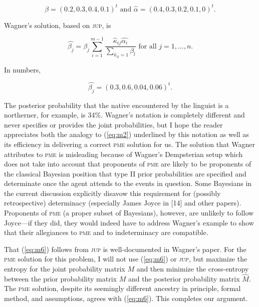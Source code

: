 \documentclass[entropy,article,submit,oneauthor,pdftex,12pt,a4paper]{mdpi}
\newcommand{\intercal}{t}
\begin{document}
\begin{equation}
  \label{eq:m5}
  \beta=(0.2,0.3,0.4,0.1)^{\intercal}\mbox{ and }\hat{\alpha}=(0.4,0.3,0.2,0.1,0)^{\intercal}.
\end{equation}

Wagner's solution, based on \textsc{jup}, is

\begin{equation}
  \label{eq:m6}
  \hat{\beta_{j}}=\beta_{j}\sum_{i=1}^{m-1}\frac{\hat{\kappa}_{ij}\hat{\alpha_{i}}}{\sum_{\hat{\kappa}_{il}=1}\beta_{l}}\mbox{ for all }j=1,\ldots,n.
\end{equation}

{\noindent}In numbers,

\begin{equation}
  \label{eq:m7}
  \hat{\beta_{j}}=(0.3,0.6,0.04,0.06)^{\intercal}.
\end{equation}

{\noindent}The posterior probability that the native encountered by
the linguist is a northerner, for example, is 34\%. Wagner's notation
is completely different and never specifies or provides the joint
probabilities, but I hope the reader appreciates both the analogy to
(\ref{eq:m2}) underlined by this notation as well as its efficiency in
delivering a correct \textsc{pme} solution for us. The solution that
Wagner attributes to \textsc{pme} is misleading because of Wagner's
Dempsterian setup which does not take into account that proponents of
\textsc{pme} are likely to be proponents of the classical Bayesian
position that type II prior probabilities are specified and
determinate once the agent attends to the events in question. Some
Bayesians in the current discussion explicitly disavow this
requirement for (possibly retrospective) determinacy (especially James
Joyce in [14] and other papers). Proponents of \textsc{pme} (a proper
subset of Bayesians), however, are unlikely to follow Joyce---if they
did, they would indeed have to address Wagner's example to show
that their allegiances to \textsc{pme} and to indeterminacy are
compatible. 

That (\ref{eq:m6}) follows from \textsc{jup} is well-documented in
Wagner's paper. For the \textsc{pme} solution for this problem, I
will not use (\ref{eq:m6}) or \textsc{jup}, but maximize the entropy
for the joint probability matrix $M$ and then minimize the
cross-entropy between the prior probability matrix $M$ and the
posterior probability matrix $\hat{M}$. The \textsc{pme} solution,
despite its seemingly different ancestry in principle, formal method,
and assumptions, agrees with (\ref{eq:m6}). This completes our
argument.
\end{document}
